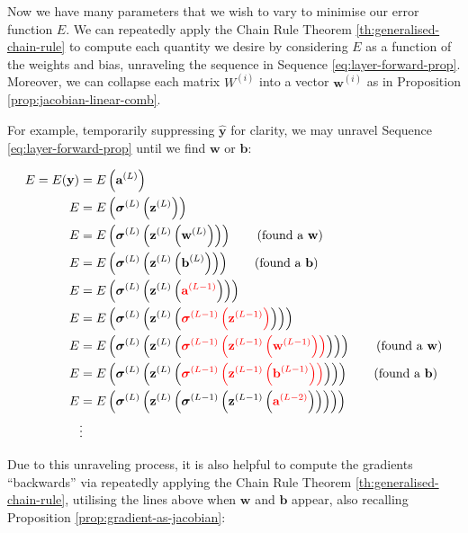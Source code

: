 \documentclass[a4paper]{article}
\theoremstyle{plain} %
\theoremstyle{definition} %
\numberwithin{equation}{subsection}
\newcommand{\vy}{{\textbf{y}}}
\newcommand{\vz}{{\textbf{z}}}
\newcommand{\vw}{{\textbf{w}}}
\newcommand{\va}{{\textbf{a}}}
\newcommand{\vb}{{\textbf{b}}}
\newcommand{\vsigma}{{\bm{\sigma}}} %
\newcommand{\vyh}{{\widehat{\textbf{y}}}}
\begin{document}
Now we have many parameters that we wish to vary to minimise our error function $E$. 
We can repeatedly apply the Chain Rule Theorem \ref{th:generalised-chain-rule} to compute 
each quantity we desire by considering $E$ as a function of the weights and bias, unraveling the sequence in 
Sequence \ref{eq:layer-forward-prop}. 
Moreover, we can collapse each matrix $W^{(i)}$ into a vector $\vw^{(i)}$ as in Proposition \ref{prop:jacobian-linear-comb}.

For example, temporarily suppressing $\vyh$ for clarity, we may unravel Sequence \ref{eq:layer-forward-prop} until we find $\vw$ or $\vb$:

\begin{align*}
  E = E(\vy) &= E\left(\va^{(L)}\right) \\
  E &= E\left(\vsigma^{(L)}\left(\vz^{(L)}\right)\right) \\
  E &= E\left(\vsigma^{(L)}\left(\vz^{(L)} \left( \vw^{(L)} \right)\right)\right) \tag{found a $\vw$}\\
  E &= E\left(\vsigma^{(L)}\left(\vz^{(L)} \left( \vb^{(L)} \right)\right)\right) \tag{found a $\vb$}\\
  E &= E\left(\vsigma^{(L)}\left(\vz^{(L)} \left( \textcolor{red}{\va^{(L-1)} }\right)\right)\right) \\
  E &= E\left(\vsigma^{(L)}\left(\vz^{(L)} \left( \textcolor{red}{\vsigma^{(L-1)} \left( \vz^{(L-1)} \right)} \right)\right)\right) \\
  E &= E\left(\vsigma^{(L)}\left(\vz^{(L)} \left( \textcolor{red}{\vsigma^{(L-1)} \left( \vz^{(L-1)} \left( \vw^{(L-1)} \right) \right)} \right)\right)\right) \tag{found a $\vw$}\\
  E &= E\left(\vsigma^{(L)}\left(\vz^{(L)} \left( \textcolor{red}{\vsigma^{(L-1)} \left( \vz^{(L-1)} \left( \vb^{(L-1)} \right) \right)} \right)\right)\right) \tag{found a $\vb$}\\
  E &= E\left(\vsigma^{(L)}\left(\vz^{(L)} \left( \vsigma^{(L-1)} \left( \vz^{(L-1)} \left( \textcolor{red}{\va^{(L-2)}} \right) \right) \right)\right)\right) \\
   &\vdots
\end{align*}

Due to this unraveling process, it is also helpful to compute the gradients ``backwards'' via repeatedly applying the Chain Rule Theorem \ref{th:generalised-chain-rule}, utilising the lines above when $\vw$ and $\vb$ appear, also recalling Proposition \ref{prop:gradient-as-jacobian}:
\end{document}
